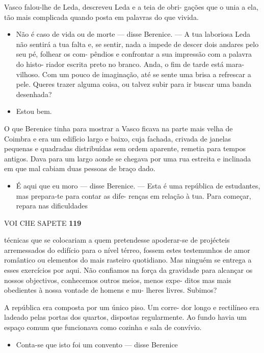 Vasco falou-lhe de Leda, descreveu Leda e a teia de obri- gações que o
unia a ela, tão mais complicada quando posta em palavras do que vivida.

\begin{itemize}
\tightlist
\item
  Não é caso de vida ou de morte --- disse Berenice. --- A tua laboriosa
  Leda não sentirá a tua falta e, se sentir, nada a impede de descer
  dois andares pelo seu pé, folhear os com- pêndios e confrontar a sua
  impressão com a palavra do histo- riador escrita preto no branco.
  Anda, o fim de tarde está mara- vilhoso. Com um pouco de imaginação,
  até se sente uma brisa a refrescar a pele. Queres trazer alguma coisa,
  ou talvez subir para ir buscar uma banda desenhada?
\item
  Estou bem.
\end{itemize}

O que Berenice tinha para mostrar a Vasco ficava na parte mais velha de
Coimbra e era um edifício largo e baixo, cuja fachada, crivada de
janelas pequenas e quadradas distribuídas sem ordem aparente, remetia
para tempos antigos. Dava para um largo aonde se chegava por uma rua
estreita e inclinada em que mal cabiam duas pessoas de braço dado.

\begin{itemize}
\tightlist
\item
  É aqui que eu moro --- disse Berenice. --- Esta é uma república de
  estudantes, mas prepara-te para contar as dife- renças em relação à
  tua. Para começar, repara nas dificuldades
\end{itemize}

VOI CHE SAPETE \textbf{119}

técnicas que se colocariam a quem pretendesse apoderar-se de projécteis
arremessados do edifício para o nível térreo, fossem estes testemunhos
de amor romântico ou elementos do mais rasteiro quotidiano. Mas ninguém
se entrega a esses exercícios por aqui. Não confiamos na força da
gravidade para alcançar os nossos objectivos, conhecemos outros meios,
menos expe- ditos mas mais obedientes à nossa vontade de homens e mu-
lheres livres. Subimos?

A república era composta por um único piso. Um corre- dor longo e
rectilíneo era ladeado pelas portas dos quartos, dispostas regularmente.
Ao fundo havia um espaço comum que funcionava como cozinha e sala de
convívio.

\begin{itemize}
\tightlist
\item
  Conta-se que isto foi um convento --- disse Berenice
\end{itemize}

